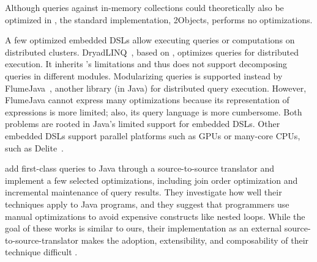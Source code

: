 
Although queries against in-memory collections could theoretically also be optimized in \LINQ, the standard implementation, {\LINQ}2Objects, performs no optimizations. 

A few optimized embedded DSLs allow executing queries or computations on distributed clusters.
DryadLINQ~\citep{Yu08}, based on \LINQ, optimizes queries for distributed
execution. It inherits \LINQ's limitations and thus does not support decomposing queries in different modules.
Modularizing queries is supported instead by FlumeJava~\citep{Chambers10},
another library (in Java) for distributed query execution.
However, FlumeJava cannot express many optimizations because its representation
of expressions is more
limited; also, its query language is more cumbersome. Both problems are rooted
in Java's limited support for embedded DSLs.
Other embedded DSLs support parallel platforms such as GPUs or many-core CPUs,
such as Delite~\citep{Rompf13}.

\citet{Willis06JQL,Willis08} add first-class queries to Java through a source-to-source translator and implement a few selected optimizations, including join order optimization and incremental maintenance of query results.
They investigate how well their techniques apply to Java programs, and they suggest that programmers use manual optimizations to avoid expensive constructs like nested loops. While the goal of these works is similar to ours, their implementation as an external source-to-source-translator makes
the adoption, extensibility, and composability of their technique difficult%
.

